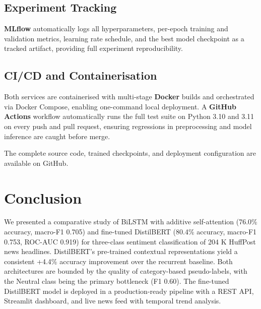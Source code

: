 \documentclass[conference]{IEEEtran}
\begin{document}
\subsection{Experiment Tracking}
\textbf{MLflow} automatically logs all hyperparameters, per-epoch
training and validation metrics, learning rate schedule, and the
best model checkpoint as a tracked artifact, providing full
experiment reproducibility.

\subsection{CI/CD and Containerisation}
Both services are containerised with multi-stage \textbf{Docker} builds
and orchestrated via Docker Compose, enabling one-command local deployment.
A \textbf{GitHub Actions} workflow automatically runs the full test
suite on Python 3.10 and 3.11 on every push and pull request, ensuring
regressions in preprocessing and model inference are caught before merge.

The complete source code, trained checkpoints, and deployment
configuration are available on GitHub.

\section{Conclusion}
\label{sec:conclusion}

We presented a comparative study of BiLSTM with additive self-attention
(76.0\% accuracy, macro-F1 0.705) and fine-tuned DistilBERT (80.4\%
accuracy, macro-F1 0.753, ROC-AUC 0.919) for three-class sentiment
classification of 204 K HuffPost news headlines. DistilBERT's
pre-trained contextual representations yield a consistent +4.4\%
accuracy improvement over the recurrent baseline. Both architectures
are bounded by the quality of category-based pseudo-labels, with the
Neutral class being the primary bottleneck (F1 0.60). The fine-tuned
DistilBERT model is deployed in a production-ready pipeline with a REST
API, Streamlit dashboard, and live news feed with temporal trend
analysis.
\end{document}

